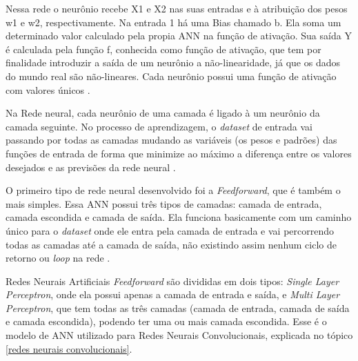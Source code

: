 \begin{figure}[H]
	\centering
\end{figure}

Nessa rede o neurônio recebe X1 e X2 nas suas entradas e à atribuição dos pesos w1 e w2, respectivamente. Na entrada 1 há uma Bias chamado b. Ela soma um determinado valor calculado pela propia ANN na função de ativação. Sua saída Y é calculada pela função f, conhecida como função de ativação, que tem por finalidade introduzir a saída de um neurônio a não-linearidade, já que os dados do mundo real são não-lineares. Cada neurônio possui uma função de ativação com valores únicos \cite{conv2}.

Na Rede neural, cada neurônio de uma camada é ligado à um neurônio da camada seguinte. No processo de aprendizagem, o \textit{dataset} de entrada vai passando por todas as camadas mudando as variáveis (os pesos e padrões) das funções de entrada de forma que minimize ao máximo a diferença entre os valores desejados e as previsões da rede neural \cite{redeneuralnvidia}.

O primeiro tipo de rede neural desenvolvido foi a \textit{Feedforward}, que é também o mais simples. Essa ANN possui três tipos de camadas: camada de entrada, camada escondida e camada de saída. Ela funciona basicamente com um caminho único para o \textit{dataset} onde ele entra pela camada de entrada e vai percorrendo todas as camadas até a camada de saída, não existindo assim nenhum ciclo de retorno ou \textit{loop} na rede \cite{conv2, redeneuralnvidia}.

Redes Neurais Artificiais \textit{Feedforward} são divididas em dois tipos: \textit{Single Layer Perceptron}, onde ela possui apenas a camada de entrada e saída, e \textit{Multi Layer Perceptron}, que tem todas as três camadas (camada de entrada, camada de saída e camada escondida), podendo ter uma ou mais camada escondida. Esse é o modelo de ANN utilizado para Redes Neurais Convolucionais, explicada no tópico \ref{redes neurais convolucionais}.

